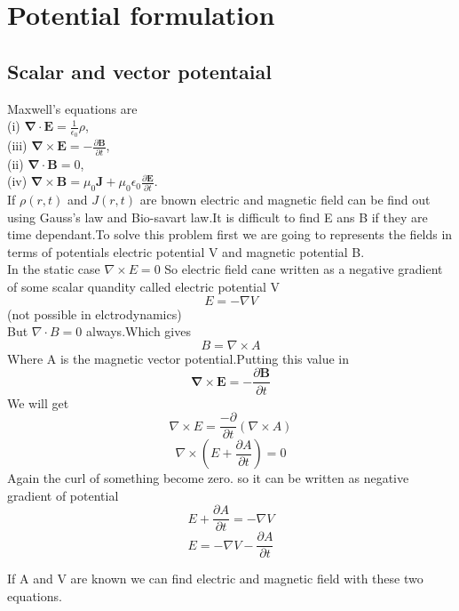 \chapter{Potential formulation}
\section{Scalar and vector potentaial}
Maxwell's equations are\\
(i) $\boldsymbol{\nabla} \cdot \mathbf{E}=\frac{1}{\epsilon_{0}} \rho$,\\
(iii) $\boldsymbol{\nabla} \times \mathbf{E}=-\frac{\partial \mathbf{B}}{\partial t}$,\\
(ii) $\boldsymbol{\nabla} \cdot \mathbf{B}=0$,\\
(iv) $\boldsymbol{\nabla} \times \mathbf{B}=\mu_{0} \mathbf{J}+\mu_{0} \epsilon_{0} \frac{\partial \mathbf{E}}{\partial t}$.\\
If $\rho(r,t)$ and $J(r,t)$ are bnown electric and magnetic field can be find out using Gauss's law and Bio-savart law.It is difficult to find E ans B if they are time dependant.To solve this problem first we are going to represents the fields in terms of potentials electric potential V and magnetic potential B.\\
In the static case $\nabla \times E=0$ So electric field cane written as a negative gradient of some scalar quandity called electric potential V\\
$$E=-\nabla V$$(not possible in elctrodynamics)\\
But $\nabla \cdot B=0$ always.Which gives \\
$$B=\nabla\times A$$
 Where A is the magnetic vector potential.Putting this value in 
$$\boldsymbol{\nabla} \times \mathbf{E}=-\frac{\partial \mathbf{B}}{\partial t}$$
We will get \\
$$\nabla \times E=\frac{-\partial }{\partial t}(\nabla \times A)$$
$$\nabla \times \left( E+\frac{\partial A}{\partial t}\right) =0$$
Again the curl of something become zero. so it can be written as negative gradient of potential
$$E+\frac{\partial A}{\partial t}=-\nabla V$$
$$E=-\nabla V-\frac{\partial A}{\partial t}$$
\begin{center}
\end{center}
If A and V are known we can find electric and magnetic field with these two equations.

